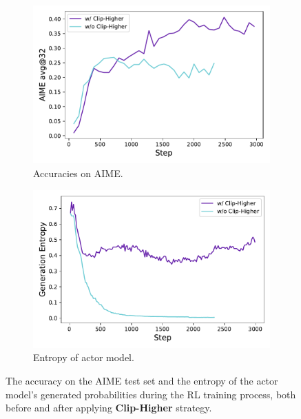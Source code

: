 \begin{figure}[t]
    \centering
    \begin{subfigure}{0.49\textwidth}
        \centering
        \includegraphics[width=\textwidth]{figures/3.1.2.pdf}
        \caption{Accuracies on AIME.}
        \label{fig:clighigh_acc}
    \end{subfigure}
    \hfill
    \begin{subfigure}{0.49\textwidth}
        \centering
        \includegraphics[width=\textwidth]{figures/3.1.1.pdf}
        \caption{Entropy of actor model.}
        \label{fig:cliphigh_entropy}
    \end{subfigure}
    \caption{The accuracy on the AIME test set and the entropy of the actor model's generated probabilities during the RL training process, both before and after applying \textbf{Clip-Higher} strategy.}
    \label{fig:clip_high}
\end{figure}



